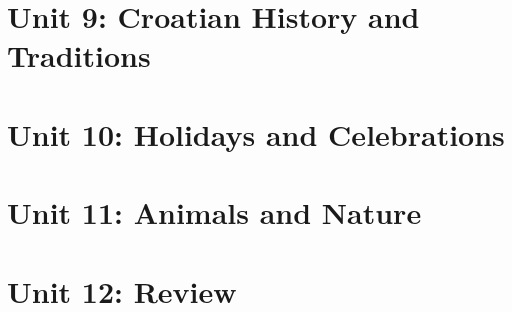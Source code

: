\section{Unit 9: Croatian History and Traditions}

\section{Unit 10: Holidays and Celebrations}

\section{Unit 11: Animals and Nature}

\section{Unit 12: Review}
